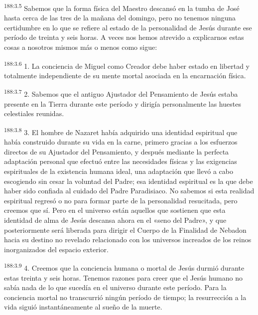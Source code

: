 \par
\textsuperscript{188:3.5} Sabemos que la forma física del Maestro descansó en la tumba de José hasta cerca de las tres de la mañana del domingo, pero no tenemos ninguna certidumbre en lo que se refiere al estado de la personalidad de Jesús durante ese período de treinta y seis horas. A veces nos hemos atrevido a explicarnos estas cosas a nosotros mismos más o menos como sigue:

\par
\textsuperscript{188:3.6} 1. La conciencia de Miguel como Creador debe haber estado en libertad y totalmente independiente de su mente mortal asociada en la encarnación física.

\par
\textsuperscript{188:3.7} 2. Sabemos que el antiguo Ajustador del Pensamiento de Jesús estaba presente en la Tierra durante este período y dirigía personalmente las huestes celestiales reunidas.

\par
\textsuperscript{188:3.8} 3. El hombre de Nazaret había adquirido una identidad espiritual que había construido durante su vida en la carne, primero gracias a los esfuerzos directos de su Ajustador del Pensamiento, y después mediante la perfecta adaptación personal que efectuó entre las necesidades físicas y las exigencias espirituales de la existencia humana ideal, una adaptación que llevó a cabo escogiendo sin cesar la voluntad del Padre; esa identidad espiritual es la que debe haber sido confiada al cuidado del Padre Paradisiaco. No sabemos si esta realidad espiritual regresó o no para formar parte de la personalidad resucitada, pero creemos que sí. Pero en el universo están aquellos que sostienen que esta identidad de alma de Jesús descansa ahora en el «seno del Padre», y que posteriormente será liberada para dirigir el Cuerpo de la Finalidad de Nebadon hacia su destino no revelado relacionado con los universos increados de los reinos inorganizados del espacio exterior.

\par
\textsuperscript{188:3.9} 4. Creemos que la conciencia humana o mortal de Jesús durmió durante estas treinta y seis horas. Tenemos razones para creer que el Jesús humano no sabía nada de lo que sucedía en el universo durante este período. Para la conciencia mortal no transcurrió ningún período de tiempo; la resurrección a la vida siguió instantáneamente al sueño de la muerte.

